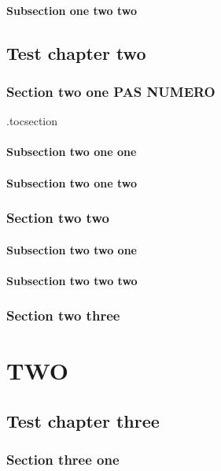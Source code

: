 \documentclass{book}
\begin{document}
\subsection{Subsection one  two two}

\chapter{Test chapter two}

\section*{Section two one PAS NUMERO}

\etocsetlocaltop.toc{section}
\localtableofcontents

\subsection{Subsection two one one}
\subsection{Subsection two one two}
\section{Section two two}
\subsection{Subsection two two one}
\subsection{Subsection two  two two}
\section{Section two three}
\localtableofcontents\label{emptytoc}

\part{TWO}
\localtableofcontents*  %

\chapter{Test chapter three}
\section{Section three one}
\end{document}

